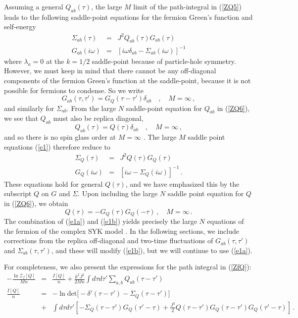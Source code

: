 \documentclass[aps,prx,preprint,onecolumn,citeautoscript,superscriptaddress,nofootinbib,
eqsecnum]{revtex4}
\newcommand{\beq}{\begin{equation}}
\newcommand{\eeq}{\end{equation}}
\def\bea{\begin{eqnarray}}
\def\eea{\end{eqnarray}}
\begin{document}
Assuming a general $Q_{ab} (\tau)$, the large $M$ limit of the path-integral in (\ref{ZQ5}) leads to the following saddle-point equations for the fermion Green's function and self-energy
\bea
\Sigma_{ab} ( \tau) &=& J^2 Q_{ab} (\tau) G_{ab} (\tau) \nonumber \\
G_{ab} (i \omega) &=& \left[ i \omega \delta_{ab} - \Sigma_{ab} (i \omega) \right]^{-1} \label{e1}
\eea
where $\lambda_a = 0$ at the $k=1/2$ saddle-point because of particle-hole symmetry. However, we must keep in mind that there cannot be any off-diagonal components of the fermion Green's function at the saddle-point, because it is not possible for fermions to condense. So we write
\beq
G_{ab} (\tau, \tau') = G_Q (\tau - \tau') \delta_{ab} \quad,\quad M=\infty\,, \label{e1c}
\eeq
and similarly for $\Sigma_{ab}$. From the large $N$ saddle-point equation for $Q_{ab}$ in (\ref{ZQ6}), we see that $Q_{ab}$ must also be replica diagonal,
\beq
Q_{ab} (\tau) = Q (\tau) \delta_{ab} \quad,\quad M=\infty\,,
\eeq
and so there is no spin glass order at $M=\infty$ \cite{SY92}. 
The large $M$ saddle point equations (\ref{e1}) therefore reduce to
\bea
\Sigma_Q ( \tau) &=& J^2 Q(\tau) G_Q (\tau) \nonumber \\
G_Q (i \omega) &=& \left[ i \omega - \Sigma_Q (i \omega) \right]^{-1} \,. \label{e1a}
\eea
These equations hold for general $Q(\tau)$, and we have emphasized this by the subscript $Q$ on $G$ and $\Sigma$. Upon including the large $N$ saddle point equation for $Q$ in (\ref{ZQ6}), we obtain
\beq
Q(\tau) = - G_Q (\tau) G_Q (-\tau)\,,\quad M=\infty\,. \label{e1b}
\eeq
The combination of (\ref{e1a}) and (\ref{e1b}) yields precisely the large $N$ equations of the fermion of the complex SYK model \cite{SY92}. In the following sections, we include corrections from the replica off-diagonal and two-time fluctuations of $G_{ab} (\tau, \tau')$ and $\Sigma_{ab} (\tau, \tau')$, and these will modify (\ref{e1b}), but we will continue to use (\ref{e1a}).

For completeness, we also present the expressions for the path integral in
 (\ref{ZfQ}):
\bea
- \frac{\ln \mathcal{Z}_f [Q]}{Mn} &=& \frac{I[Q]}{n} + \frac{k^2 J^2}{2Mn}  \int d \tau d \tau' \sum_{a,b} Q_{ab} (\tau-\tau') \nonumber \\
\frac{I[Q]}{n} &=& -  \ln \mbox{det} 
 \biggl[ - \delta' (\tau - \tau')   - \Sigma_Q (\tau - \tau') \biggr]   \label{ZfQa} \\
&+& \int d \tau d \tau' \left[ - \Sigma_Q (\tau - \tau') G_Q (\tau' - \tau) + \frac{J^2}{2} Q(\tau - \tau') G_Q (\tau- \tau') G_Q (\tau'- \tau) \right]\,. \nonumber
\eea
\end{document}
